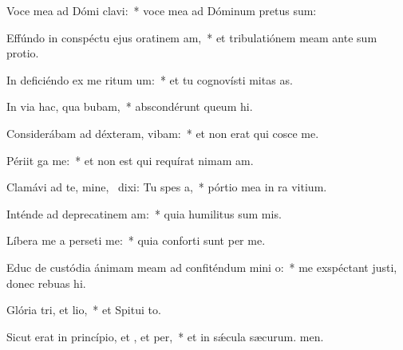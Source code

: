 \item Voce mea ad Dómi clavi:~* voce mea ad Dóminum pretus sum:
\item Effúndo in conspéctu ejus oratinem am,~* et tribulatiónem meam ante sum protio.
\item In deficiéndo ex me ritum um:~* et tu cognovísti mitas as.
\item In via hac, qua bubam,~* abscondérunt queum hi.
\item Considerábam ad déxteram,  vibam:~* et non erat qui cosce me.
\item Périit ga  me:~* et non est qui requírat nimam am.
\item Clamávi ad te, mine,~\pscross{} dixi: Tu  spes a,~* pórtio mea in ra vitium.
\item Inténde ad deprecatinem am:~* quia humilitus sum mis.
\item Líbera me a perseti me:~* quia conforti sunt per me.
\item Educ de custódia ánimam meam ad confiténdum mini o:~* me exspéctant justi, donec rebuas hi.
\item Glória tri, et lio,~* et Spitui to.
\item Sicut erat in princípio, et , et per,~* et in sǽcula sæcurum. men.
